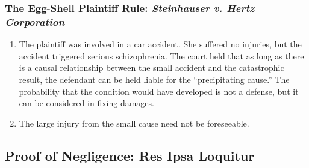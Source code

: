 \subsubsection{The Egg-Shell Plaintiff Rule: \emph{Steinhauser v. Hertz Corporation}}

\begin{enumerate}
    \item The plaintiff was involved in a car accident. She suffered no injuries, but the accident triggered serious schizophrenia. The court held that as long as there is a causal relationship between the small accident and the catastrophic result, the defendant can be held liable for the ``precipitating cause.'' The probability that the condition would have developed is not a defense, but it can be considered in fixing damages.
    \item The large injury from the small cause need not be foreseeable.
\end{enumerate}

\subsection{Proof of Negligence: Res Ipsa Loquitur}

